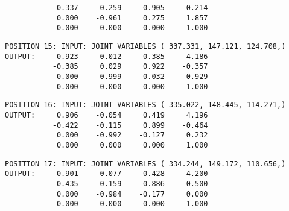 \begin{verbatim}
           -0.337     0.259     0.905    -0.214
            0.000    -0.961     0.275     1.857
            0.000     0.000     0.000     1.000
\end{verbatim} \pagebreak[1]\begin{verbatim}
POSITION 15: INPUT: JOINT VARIABLES ( 337.331, 147.121, 124.708,)
OUTPUT:     0.923     0.012     0.385     4.186
           -0.385     0.029     0.922    -0.357
            0.000    -0.999     0.032     0.929
            0.000     0.000     0.000     1.000
\end{verbatim} \pagebreak[1]\begin{verbatim}
POSITION 16: INPUT: JOINT VARIABLES ( 335.022, 148.445, 114.271,)
OUTPUT:     0.906    -0.054     0.419     4.196
           -0.422    -0.115     0.899    -0.464
            0.000    -0.992    -0.127     0.232
            0.000     0.000     0.000     1.000
\end{verbatim} \pagebreak[1]\begin{verbatim}
POSITION 17: INPUT: JOINT VARIABLES ( 334.244, 149.172, 110.656,)
OUTPUT:     0.901    -0.077     0.428     4.200
           -0.435    -0.159     0.886    -0.500
            0.000    -0.984    -0.177     0.000
            0.000     0.000     0.000     1.000
\end{verbatim} \pagebreak[1]